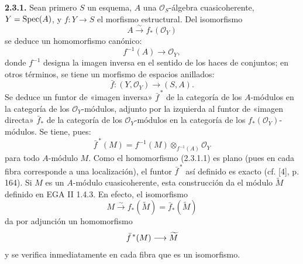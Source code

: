 \textbf{2.3.1.} Sean primero \(S\) un esquema, \(A\) una \(\mathcal O_S\)-álgebra cuasicoherente, \(Y=\Spec(A)\), y \(f:Y\to S\) el morfismo estructural. Del isomorfismo
\[
  A\xrightarrow{\sim} f_*(\mathcal O_Y)
\]
se deduce un homomorfismo canónico:
\begin{equation}\tag{2.3.1.1}
  f^{-1}(A)\longrightarrow \mathcal O_Y,
\end{equation}
donde \(f^{-1}\) designa la imagen inversa en el sentido de los haces de conjuntos; en otros términos, se tiene un morfismo de espacios anillados:
\begin{equation}\tag{2.3.1.2}
  \bar f:(Y,\mathcal O_Y)\longrightarrow (S,A).
\end{equation}
Se deduce un funtor de «imagen inversa» \(\bar f^{\,*}\) de la categoría de los \(A\)-módulos en la categoría de los \(\mathcal O_Y\)-módulos, adjunto por la izquierda al funtor de «imagen directa» \(\bar f_*\) de la categoría de los \(\mathcal O_Y\)-módulos en la categoría de los \(f_*(\mathcal O_Y)\)-módulos. Se tiene, pues:
\begin{equation}\tag{2.3.1.3}
  \bar f^{\,*}(M)=f^{-1}(M)\otimes_{f^{-1}(A)}\mathcal O_Y
\end{equation}
para todo \(A\)-módulo \(M\).
Como el homomorfismo (2.3.1.1) es plano (pues en cada fibra corresponde a una localización), el funtor \(\bar f^{\,*}\) así definido es exacto (cf. [4], p. 164). Si \(M\) es un \(A\)-módulo cuasicoherente, esta construcción da el módulo \(\widetilde M\) definido en EGA II 1.4.3. En efecto, el isomorfismo
\[
  M\xrightarrow{\sim} f_*(\widetilde M)=\bar f_*(\widetilde M)
\]
da por adjunción un homomorfismo
\[
  \bar f^{\,*}(M)\longrightarrow \sisi{M}{\widetilde M}
\]
y se verifica inmediatamente en cada fibra que es un isomorfismo.

